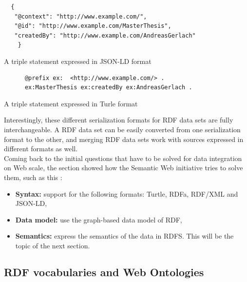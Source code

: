 \begin{listing}[H]
	\begin{verbatim}
  {
   "@context": "http://www.example.com/",
   "@id": "http://www.example.com/MasterThesis",
   "createdBy": "http://www.example.com/AndreasGerlach"
 	}
	\end{verbatim}
\caption{A triple statement expressed in \gls{JSON-LD} format}
\label{lst:jsonld_meta_data}
\end{listing}

\begin{listing}[H]
	\begin{verbatim}
	  @prefix ex:  <http://www.example.com/> .
	  ex:MasterThesis ex:createdBy ex:AndreasGerlach .
	\end{verbatim}
\caption{A triple statement expressed in Turle format}
\label{lst:turtle_meta_data}
\end{listing}

Interestingly, these different serialization formats for \gls{RDF} data sets are fully interchangeable. A \gls{RDF} data set can be easily converted from one serialization format to the other, and merging \gls{RDF} data sets work with sources expressed in different formats as well. \\

Coming back to the initial questions that have to be solved for data integration on Web scale, the section showed how the Semantic Web initiative tries to solve them, such as this \citep[pg.23-25]{antoniou2012semantic}: \@

\begin{itemize}
	\item \textbf{Syntax:} support for the following formats: Turtle, \gls{RDFa}, \gls{RDF}/\gls{XML} and \gls{JSON-LD},
	\item \textbf{Data model:} use the graph-based data model of \gls{RDF},
	\item \textbf{Semantics:} express the semantics of the data in \gls{RDFS}. This will be the topic of the next section.
\end{itemize}


\subsection{\gls{RDF} vocabularies and Web Ontologies}
\label{sec:semantic_vocab_ontologies}

